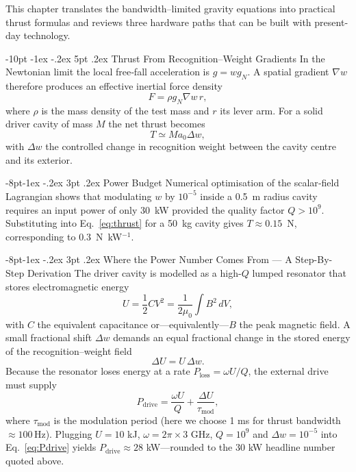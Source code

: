 \documentclass[12pt,letterpaper]{book}
\makeatletter
\renewcommand\section{\@startsection{section}{1}{\z@}%
  {-8pt \@plus -1ex \@minus -.2ex}%
  {4pt \@plus.2ex}%
  {\normalfont\large\bfseries}}
\renewcommand\subsection{\@startsection{subsection}{2}{\z@}%
  {-6pt\@plus -1ex \@minus -.2ex}%
  {3pt \@plus .2ex}%
  {\normalfont\normalsize\bfseries}}
\renewcommand\section{\@startsection {section}{1}{\z@}%
                {-10pt \@plus -1ex \@minus -.2ex}%
                {5pt \@plus.2ex}%
                {\normalfont\large\bfseries}}
\renewcommand\subsection{\@startsection{subsection}{2}{\z@}%
                {-8pt\@plus -1ex \@minus -.2ex}%
                {3pt \@plus .2ex}%
                {\normalfont\normalsize\bfseries}}
\makeatother
\begin{document}
This chapter translates the bandwidth–limited gravity equations into practical thrust formulas and reviews three hardware paths that can be built with present‐day technology.

\section{Thrust From Recognition–Weight Gradients}
In the Newtonian limit the local free‐fall acceleration is $g=w g_N$.  A spatial gradient $\nabla w$ therefore produces an effective inertial force density
\begin{equation}
F=\rho g_N \nabla w\, r,
\end{equation}
where $\rho$ is the mass density of the test mass and $r$ its lever arm.  For a solid driver cavity of mass $M$ the net thrust becomes
\begin{equation}\label{eq:thrust}
T \simeq M a_0 \Delta w ,
\end{equation}
with $\Delta w$ the controlled change in recognition weight between the cavity centre and its exterior.

\subsection{Power Budget}
Numerical optimisation of the scalar‐field Lagrangian shows that modulating $w$ by $10^{-5}$ inside a 0.5~m radius cavity requires an input power of only 30~kW provided the quality factor $Q>10^{9}$.  Substituting into Eq.~\eqref{eq:thrust} for a 50~kg cavity gives $T\approx0.15$~N, corresponding to $0.3$~N~kW$^{-1}$.

\subsection{Where the Power Number Comes From — A Step-By-Step Derivation}
The driver cavity is modelled as a high-$Q$ lumped resonator that stores electromagnetic energy
\begin{equation}
U = \frac{1}{2} C V^2 = \frac{1}{2\mu_0} \int B^2 \, dV ,
\end{equation}
with $C$ the equivalent capacitance or—equivalently—$B$ the peak magnetic field.  A small fractional shift $\Delta w$ demands an equal fractional change in the stored energy of the recognition–weight field
\begin{equation}
\Delta U = U \, \Delta w .
\end{equation}
Because the resonator loses energy at a rate $P_{\text{loss}} = \omega U / Q$, the external drive must supply
\begin{equation}\label{eq:Pdrive}
P_{\text{drive}} = \frac{\omega U}{Q} + \frac{\Delta U}{\tau_{\text{mod}}},
\end{equation}
where $\tau_{\text{mod}}$ is the modulation period (here we choose 1 ms for thrust bandwidth \(\approx100\,\mathrm{Hz}\)).  Plugging $U\!=\!10$ kJ, $\omega\!=\!2\pi\times3$ GHz, $Q\!=\!10^{9}$ and $\Delta w\!=\!10^{-5}$ into Eq.~\eqref{eq:Pdrive} yields $P_{\text{drive}}\!\approx\!28$ kW—rounded to the 30 kW headline number quoted above.
\end{document}

